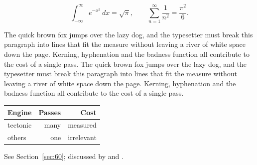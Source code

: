 \documentclass{article}
\begin{document}
\begin{equation}\label{eq:60}
\int_{-\infty}^{\infty} e^{-x^{2}}\,dx = \sqrt{\pi}, \qquad
\sum_{n=1}^{\infty} \frac{1}{n^{2}} = \frac{\pi^{2}}{6}.
\end{equation}

The quick brown fox jumps over the lazy dog, and the typesetter must break this paragraph into lines that fit the measure without leaving a river of white space down the page. Kerning, hyphenation and the badness function all contribute to the cost of a single pass. The quick brown fox jumps over the lazy dog, and the typesetter must break this paragraph into lines that fit the measure without leaving a river of white space down the page. Kerning, hyphenation and the badness function all contribute to the cost of a single pass. 

\begin{center}
\begin{tabular}{lrr}
\toprule
Engine & Passes & Cost \\
\midrule
tectonic & many & measured \\
others & one & irrelevant \\
\bottomrule
\end{tabular}
\end{center}

See Section~\ref{sec:60}; discussed by \textcite{k1} and \textcite{l3}.
\printbibliography
\end{document}
